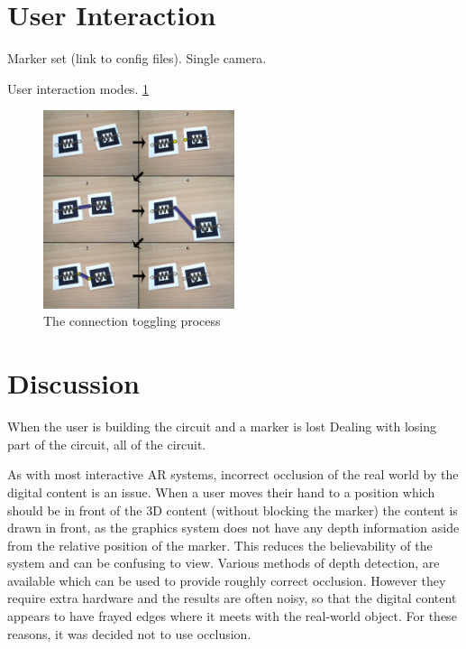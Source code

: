 \section{User Interaction}
Marker set (link to config files).
Single camera.

User interaction modes.
\ref{connection}

\begin{figure}
\begin{center}
\includegraphics[width=0.50\textwidth]{connection}
\end{center}
\caption{The connection toggling process}
\label{connection}
\end{figure}

\section{Discussion}

When the user is building the circuit and a marker is lost
Dealing with losing part of the circuit, all of the circuit.

As with most interactive AR systems, incorrect occlusion of the real world by the digital content is an issue. When a user moves their hand to a position which should be in front of the 3D content (without blocking the marker) the content is drawn in front, as the graphics system does not have any depth information aside from the relative position of the marker. This reduces the believability of the system and can be confusing to view. Various methods of depth detection, are available which can be used to provide roughly correct occlusion. However they require extra hardware and the results are often noisy, so that the digital content appears to have frayed edges where it meets with the real-world object. For these reasons, it was decided not to use occlusion.

